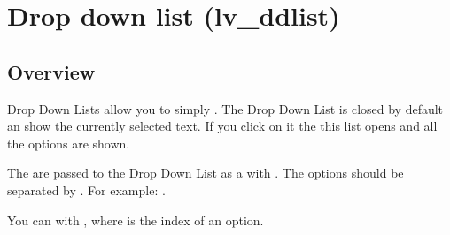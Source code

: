 \documentclass[letterpaper,10pt,english]{sphinxmanual}
\begin{document}
\begin{fulllineitems}
\begin{fulllineitems}
\label{\detokenize{object-types/cont:_CPPv4N13lv_cont_ext_t7fit_topE}}%
\pysigstartmultiline
{}%
\pysigstopmultiline
\end{fulllineitems}


\begin{fulllineitems}
\label{\detokenize{object-types/cont:_CPPv4N13lv_cont_ext_t10fit_bottomE}}%
\pysigstartmultiline
{}%
\pysigstopmultiline
\end{fulllineitems}


\end{fulllineitems}



\section{Drop down list (lv\_ddlist)}
\label{\detokenize{object-types/ddlist:drop-down-list-lv-ddlist}}\label{\detokenize{object-types/ddlist::doc}}

\subsection{Overview}
\label{\detokenize{object-types/ddlist:overview}}
Drop Down Lists allow you to simply . The Drop Down List is closed by default an show the currently selected text. If you click on it the this list opens and all the options are shown.

The  are passed to the Drop Down List as a  with . The options should be separated by . For example: .

You can  with , where  is the index of an option.
\end{document}
